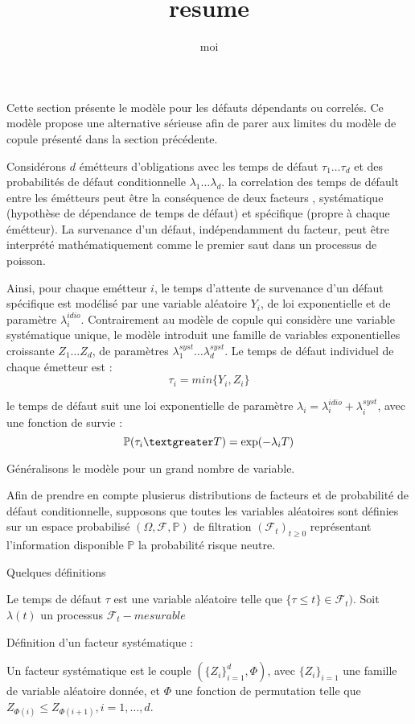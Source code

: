 \documentclass[10pt,a4paper]{article}
\author{moi}
\title{resume}
\begin{document}
	
	Cette section présente le modèle pour les défauts dépendants ou correlés. Ce modèle propose une alternative sérieuse afin de parer aux limites du modèle de copule présenté dans la section précédente.
	
	Considérons $d$  émétteurs d'obligations avec les temps de défaut $ \tau_1 \ldots \tau_d $ et des probabilités de défaut conditionnelle $ \lambda_1 \ldots \lambda_d $. la correlation des temps de défault  entre les émétteurs peut être la conséquence de deux facteurs , systématique (hypothèse de dépendance de temps de défaut) et spécifique (propre à chaque émétteur). La survenance d'un défaut, indépendamment du facteur, peut être interprété mathématiquement comme le premier saut dans un processus de poisson.
	
	Ainsi, pour chaque emétteur $ i $, le temps d'attente de survenance d'un défaut spécifique est modélisé par une variable aléatoire $ Y_i $, de loi exponentielle et de paramètre $ \lambda_i^{idio} $. Contrairement au modèle de copule qui considère une variable systématique unique, le modèle introduit une famille de variables exponentielles croissante $ Z_1 \ldots Z_d $, de paramètres $ \lambda_1^{syst} \ldots \lambda_d^{syst} $. Le temps de défaut individuel de chaque émetteur est : 
	$$ \tau_i = min\{ Y_i, Z_i\} $$
	
	le temps de défaut suit une loi exponentielle de paramètre $ \lambda_i = \lambda_i^{idio} + \lambda_i^{syst}  $, avec une fonction de survie :
	$$\mathbb{P}( \tau_i \textgreater T) = \exp(-\lambda_i T) $$
	
	Généralisons le modèle pour un grand nombre de variable.
	
	Afin de prendre en compte plusierus distributions de facteurs et de probabilité de défaut conditionnelle, supposons que toutes les variables aléatoires sont définies sur un espace probabilisé $ (\Omega,\mathcal{F},\mathbb{P}) $ de filtration   $ (\mathcal{F}_t)_{t\geq0} $ représentant l'information disponible $ \mathbb{P} $ la probabilité risque neutre.
	
	Quelques définitions
	
	Le temps de défaut $ \tau $ est une variable aléatoire telle que $ \{ \tau \leq t\} \in \mathcal{F}_t)$.
	Soit $ \lambda(t) $  un processus $ \mathcal{F}_t-mesurable $
	
	Définition d'un facteur systématique :
	
	Un facteur systématique est le couple $ (\{ Z_i\}_{i=1}^{d}, \varPhi ) $, avec $ \{ Z_i\}_{i=1} $ une famille de variable aléatoire donnée, et $ \varPhi $ une fonction de permutation telle que 
	$  Z_{\varPhi(i)} \leq Z_{\varPhi(i+1)}, i=1,\ldots,d $.
	
\end{document}
